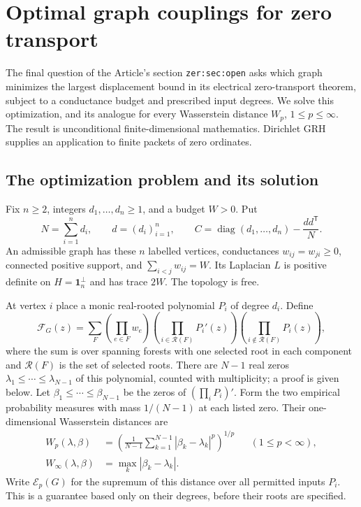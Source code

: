 \section{Optimal graph couplings for zero transport}
\label{sec:graph-minimax}

The final question of the Article's section \texttt{zer:sec:open} asks which
graph minimizes the largest displacement bound in its electrical zero-transport
theorem, subject to a conductance budget and prescribed input degrees.
We solve this optimization, and its analogue for every Wasserstein distance
$W_p$, $1\le p\le\infty$. The result is unconditional finite-dimensional
mathematics. Dirichlet GRH supplies an application to finite packets of zero
ordinates.

\subsection{The optimization problem and its solution}

Fix $n\ge2$, integers $d_1,\ldots,d_n\ge1$, and a budget $W>0$. Put
\begin{equation}\label{gm:eq:C}
 N=\sum_{i=1}^n d_i,\qquad d=(d_i)_{i=1}^n,\qquad
 C=\operatorname{diag}(d_1,\ldots,d_n)-\frac{dd^{\mathsf T}}N.
\end{equation}
An admissible graph has these $n$ labelled vertices, conductances
$w_{ij}=w_{ji}\ge0$, connected positive support, and
$\sum_{i<j}w_{ij}=W$. Its Laplacian $L$ is positive definite on
$H=\mathbf1_n^\perp$ and has trace $2W$. The topology is free.

At vertex $i$ place a monic real-rooted polynomial $P_i$ of degree $d_i$.
Define
\begin{equation}\label{gm:eq:forest}
 \mathcal F_G(z)=\sum_{F}
 \left(\prod_{e\in F}w_e\right)
 \left(\prod_{i\in\mathcal R(F)}P_i'(z)\right)
 \left(\prod_{i\notin\mathcal R(F)}P_i(z)\right),
\end{equation}
where the sum is over spanning forests with one selected root in each
component and $\mathcal R(F)$ is the set of selected roots. There are $N-1$
real zeros $\lambda_1\le\cdots\le\lambda_{N-1}$ of this polynomial, counted
with multiplicity; a proof is given below. Let
$\beta_1\le\cdots\le\beta_{N-1}$ be the zeros of
$(\prod_iP_i)'$. Form the two empirical probability measures with mass
$1/(N-1)$ at each listed zero. Their one-dimensional Wasserstein distances are
\begin{align}
 W_p(\lambda,\beta)&=
 \left(\frac1{N-1}\sum_{k=1}^{N-1}|\beta_k-\lambda_k|^p\right)^{1/p}
 &&(1\le p<\infty),\label{gm:eq:Wp}\\
 W_\infty(\lambda,\beta)&=\max_k|\beta_k-\lambda_k|.\nonumber
\end{align}
Write $\mathcal E_p(G)$ for the supremum of this distance over all permitted
inputs $P_i$. This is a guarantee based only on their degrees, before their
roots are specified.

